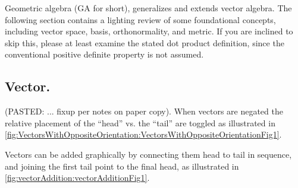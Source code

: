 %
%
Geometric algebra (GA for short), generalizes and extends vector algebra.
The following section contains a lighting review of some 
foundational concepts, including
vector space, basis, orthonormality, and metric.
If you are inclined to skip this, please at least examine the
stated dot product definition, since the conventional positive definite property is not assumed.

\subsection{Vector.}

(PASTED: ... fixup per notes on paper copy).
When vectors are negated the relative placement of the ``head'' vs. the ``tail'' are toggled as illustrated in \cref{fig:VectorsWithOppositeOrientation:VectorsWithOppositeOrientationFig1}.

Vectors can be added graphically by connecting them head to tail in sequence, and joining the first tail point to the final head, as
illustrated in
\cref{fig:vectorAddition:vectorAdditionFig1}.


